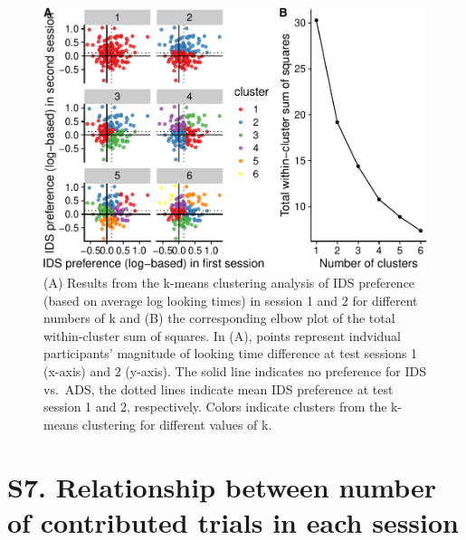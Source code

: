 \documentclass[
  man, donotrepeattitle,floatsintext]{apa6}
\begin{document}
\begin{figure}
\centering
\includegraphics{MB1T_supplement_files/figure-latex/fig6-1.pdf}
\caption{\label{fig:fig6} (A) Results from the k-means clustering analysis of IDS preference (based on average log looking times) in session 1 and 2 for different numbers of k and (B) the corresponding elbow plot of the total within-cluster sum of squares. In (A), points represent indvidual participants' magnitude of looking time difference at test sessions 1 (x-axis) and 2 (y-axis). The solid line indicates no preference for IDS vs.~ADS, the dotted lines indicate mean IDS preference at test session 1 and 2, respectively. Colors indicate clusters from the k-means clustering for different values of k.}
\end{figure}

\hypertarget{s7.-relationship-between-number-of-contributed-trials-in-each-session}{%
\section{S7. Relationship between number of contributed trials in each session}\label{s7.-relationship-between-number-of-contributed-trials-in-each-session}}
\end{document}
